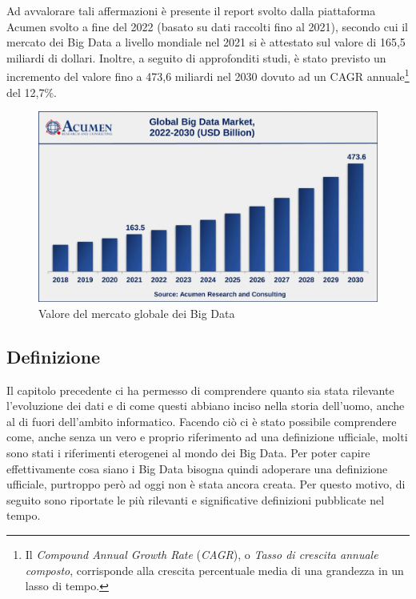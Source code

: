 Ad avvalorare tali affermazioni è presente il report svolto dalla piattaforma Acumen svolto a fine del 2022 (basato su dati raccolti fino al 2021), secondo cui il mercato dei Big Data a livello mondiale nel 2021 si è attestato sul valore di 165,5 miliardi di dollari. Inoltre, a seguito di approfonditi studi, è stato previsto un incremento del valore fino a 473,6 miliardi nel 2030 dovuto ad un CAGR annuale\footnote{Il \textit{Compound Annual Growth Rate} (\textit{CAGR}), o \textit{Tasso di crescita annuale composto}, corrisponde alla crescita percentuale media di una grandezza in un lasso di tempo.\cite{borsa_italiana_cagr}} del 12,7\%.\cite{acumen_big_data_market}

\begin{figure}[h!]
    \centering
    \includegraphics[width=0.9\linewidth]{figure/capitolo_2/Global-Big-Data-Market.pdf}
    \caption{Valore del mercato globale dei Big Data}
    \label{fig:Global-Big-Data-Market}
\end{figure}

\subsection{Definizione}

Il capitolo precedente ci ha permesso di comprendere quanto sia stata rilevante l'evoluzione dei dati e di come questi abbiano inciso nella storia dell'uomo, anche al di fuori dell'ambito informatico. Facendo ciò ci è stato possibile comprendere come, anche senza un vero e proprio riferimento ad una definizione ufficiale, molti sono stati i riferimenti eterogenei al mondo dei Big Data. Per poter capire effettivamente cosa siano i Big Data bisogna quindi adoperare una definizione ufficiale, purtroppo però ad oggi non è stata ancora creata. Per questo motivo, di seguito sono riportate le più rilevanti e significative definizioni pubblicate nel tempo.

